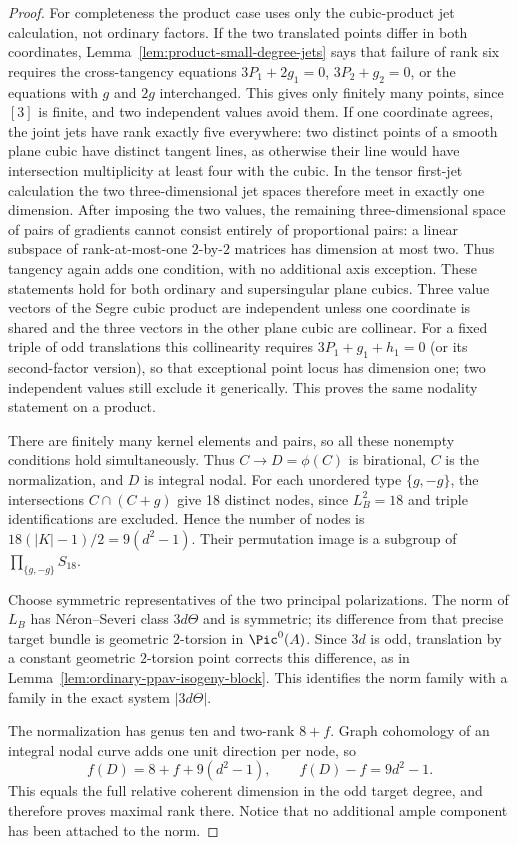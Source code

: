 \begin{proof}
For completeness the product case uses only the cubic-product jet
calculation, not ordinary factors. If the two translated points differ
in both coordinates, Lemma~\ref{lem:product-small-degree-jets} says
that failure of rank six requires the cross-tangency equations
$3P_1+2g_1=0$, $3P_2+g_2=0$, or the equations with $g$ and $2g$
interchanged. This gives only finitely many points, since $[3]$
is finite, and two independent values avoid them. If one coordinate
agrees, the joint jets have rank exactly five everywhere: two
distinct points of a smooth plane cubic have distinct tangent lines,
as otherwise their line would have intersection multiplicity at least
four with the cubic. In the tensor first-jet calculation the two
three-dimensional jet spaces therefore meet in exactly one dimension.
After imposing the two values, the remaining three-dimensional space
of pairs of gradients cannot consist entirely of proportional pairs:
a linear subspace of rank-at-most-one $2$-by-$2$ matrices has dimension
at most two. Thus tangency again adds one condition, with no additional
axis exception. These statements hold for both ordinary and
supersingular plane cubics. Three value vectors of the Segre cubic
product are independent unless one coordinate is shared and the
three vectors in the other plane cubic are collinear. For a fixed
triple of odd translations this collinearity requires
$3P_1+g_1+h_1=0$ (or its second-factor version), so that exceptional
point locus has dimension one; two independent values still exclude
it generically. This proves the same nodality statement on a product.

There are finitely many kernel elements and pairs, so all these
nonempty conditions hold simultaneously. Thus $C\to D=\phi(C)$ is
birational, $C$ is the normalization, and $D$ is integral nodal.
For each unordered type $\{g,-g\}$, the intersections
$C\cap(C+g)$ give 18 distinct nodes, since $L_B^2=18$ and triple
identifications are excluded. Hence the number of nodes is
$18(|K|-1)/2=9(d^2-1)$. Their permutation image is a subgroup of
$\prod_{\{g,-g\}}S_{18}$.

Choose symmetric representatives of the two principal polarizations.
The norm of $L_B$ has N\'eron--Severi class $3d\Theta$ and is symmetric;
its difference from that precise target bundle is geometric
$2$-torsion in $\Pic^0(A)$. Since $3d$ is odd, translation by a
constant geometric $2$-torsion point corrects this difference,
as in Lemma~\ref{lem:ordinary-ppav-isogeny-block}.
This identifies the norm family with a family in the exact system
$|3d\Theta|$.

The normalization has genus ten and two-rank $8+f$.
Graph cohomology of an integral nodal curve adds one unit direction
per node, so
\[
             f(D)=8+f+9(d^2-1),\qquad
             f(D)-f=9d^2-1.
\]
This equals the full relative coherent dimension in the odd target
degree, and therefore proves maximal rank there. Notice that no
additional ample component has been attached to the norm.
\end{proof}

